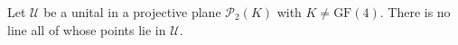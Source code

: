 Let $\mathcal{U}$ be a unital in a projective plane $\mathcal{P}_2(K)$ with $K \neq \text{GF}(4)$. There is no line all of whose points lie in $\mathcal{U}$.
